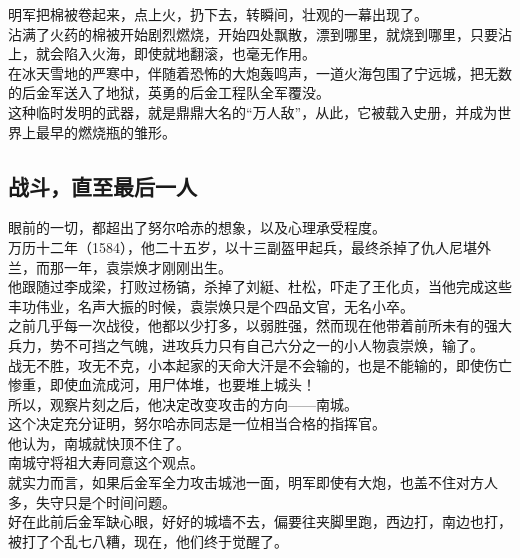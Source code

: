 \begin{multicols}{\theparacolNo}
明军把棉被卷起来，点上火，扔下去，转瞬间，壮观的一幕出现了。\\

沾满了火药的棉被开始剧烈燃烧，开始四处飘散，漂到哪里，就烧到哪里，只要沾上，就会陷入火海，即使就地翻滚，也毫无作用。\\

在冰天雪地的严寒中，伴随着恐怖的大炮轰鸣声，一道火海包围了宁远城，把无数的后金军送入了地狱，英勇的后金工程队全军覆没。\\

这种临时发明的武器，就是鼎鼎大名的“万人敌”，从此，它被载入史册，并成为世界上最早的燃烧瓶的雏形。\\

\subsection{战斗，直至最后一人}
眼前的一切，都超出了努尔哈赤的想象，以及心理承受程度。\\

万历十二年（1584），他二十五岁，以十三副盔甲起兵，最终杀掉了仇人尼堪外兰，而那一年，袁崇焕才刚刚出生。\\

他跟随过李成梁，打败过杨镐，杀掉了刘綎、杜松，吓走了王化贞，当他完成这些丰功伟业，名声大振的时候，袁崇焕只是个四品文官，无名小卒。\\

之前几乎每一次战役，他都以少打多，以弱胜强，然而现在他带着前所未有的强大兵力，势不可挡之气魄，进攻兵力只有自己六分之一的小人物袁崇焕，输了。\\

战无不胜，攻无不克，小本起家的天命大汗是不会输的，也是不能输的，即使伤亡惨重，即使血流成河，用尸体堆，也要堆上城头！\\

所以，观察片刻之后，他决定改变攻击的方向——南城。\\

这个决定充分证明，努尔哈赤同志是一位相当合格的指挥官。\\

他认为，南城就快顶不住了。\\

南城守将祖大寿同意这个观点。\\

就实力而言，如果后金军全力攻击城池一面，明军即使有大炮，也盖不住对方人多，失守只是个时间问题。\\

好在此前后金军缺心眼，好好的城墙不去，偏要往夹脚里跑，西边打，南边也打，被打了个乱七八糟，现在，他们终于觉醒了。\\


\end{multicols}
